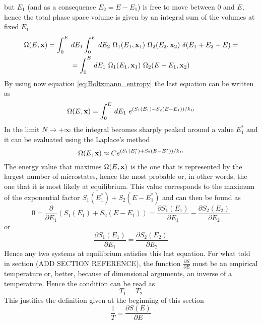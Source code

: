 but $E_1$ (and as a consequence $E_2 = E - E_1$) is free to move between $0$ and $E$, hence the total phase space volume is given by an integral sum of the volumes at fixed $E_1$ \\
\begin{gather*}
    \Omega(E, \mathbf{x}) = \int_0^E \, dE_1 \int_0^E \, dE_2 \ \Omega_1(E_1, \mathbf{x}_1) \ \Omega_2(E_2, \mathbf{x}_2) \ \delta(E_1 + E_2 - E) = \\
    = \int_0^E \, dE_1 \ \Omega_1(E_1, \mathbf{x}_1) \ \Omega_2(E - E_1, \mathbf{x}_2)
\end{gather*}
By using now equation \ref{eq:Boltzmann_entropy} the last equation can be written as 
\begin{equation*}
    \Omega(E, \mathbf{x}) = \int_0^E \, dE_1 \ e^{(S_1(E_1) + S_2(E-E_1))/k_B}
\end{equation*}
In the limit $N \to +\infty$ the integral becomes sharply peaked around a value $E_1^*$ and it can be evaluated using the Laplace's method
\begin{equation*}
    \Omega(E, \mathbf{x}) \approx C e^{(S_1(E_1^*) + S_2(E-E_1^*))/k_B}
\end{equation*}
The energy value that maximes $\Omega(E, \mathbf{x})$ is the one that is represented by the largest number of microstates, hence the most probable or, in other words, the one that it is most likely at equilibrium. This value corresponds to the maximum of the exponential factor $S_1(E_1^*) + S_2(E-E_1^*)$ and can then be found as 
\begin{equation*}
    0 = \frac{\partial}{\partial E_1}(S_1(E_1) + S_2(E-E_1)) = \frac{\partial S_1(E_1)}{\partial E_1} - \frac{\partial S_2(E_2)}{\partial E_2} 
\end{equation*}
or 
\begin{equation*}
    \frac{\partial S_1(E_1)}{\partial E_1} = \frac{\partial S_2(E_2)}{\partial E_2} 
\end{equation*}
Hence any two systems at equilibrium satisfies this last equation. For what told in section (ADD SECTION REFERENCE), the function 
$\frac{\partial S}{\partial E}$ must be an empirical temperature or, better, because of dimensional arguments, an inverse of a temperature. Hence the condition can be read as 
\begin{equation*}
    T_1 = T_2
\end{equation*}
This justifies the definition given at the beginning of this section 
\begin{equation*}
    \frac{1}{T} = \frac{\partial S(E)}{\partial E}
\end{equation*}